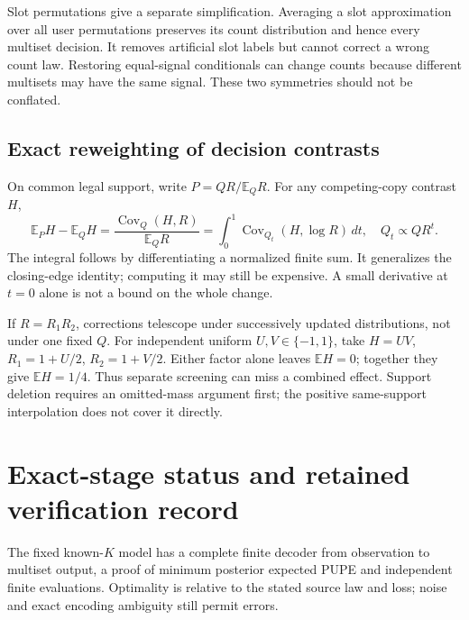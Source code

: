 \documentclass[10pt,a4paper]{article}
\newcommand{\E}{\mathbb E}
\begin{document}
Slot permutations give a separate simplification. Averaging a slot approximation over all user permutations
preserves its count distribution and hence every multiset decision. It removes artificial slot labels but
cannot correct a wrong count law. Restoring equal-signal conditionals can change counts because different
multisets may have the same signal. These two symmetries should not be conflated.

\subsection{Exact reweighting of decision contrasts}
On common legal support, write $P=QR/\E_QR$. For any competing-copy contrast $H$,
\begin{equation}
 \E_PH-\E_QH=\frac{\operatorname{Cov}_Q(H,R)}{\E_QR}
 =\int_0^1\operatorname{Cov}_{Q_t}(H,\log R)\,dt,
 \quad Q_t\propto Q R^t.
 \label{eq:combined-sensitivity}
\end{equation}
The integral follows by differentiating a normalized finite sum. It generalizes the closing-edge identity;
computing it may still be expensive. A small derivative at $t=0$ alone is not a bound on the whole change.

If $R=R_1R_2$, corrections telescope under successively updated distributions, not under one fixed $Q$.
For independent uniform $U,V\in\{-1,1\}$, take $H=UV$, $R_1=1+U/2$, $R_2=1+V/2$. Either factor alone leaves
$\E H=0$; together they give $\E H=1/4$. Thus separate screening can miss a combined effect. Support deletion
requires an omitted-mass argument first; the positive same-support interpolation does not cover it directly.

\clearpage
\section{Exact-stage status and retained verification record}
The fixed known-$K$ model has a complete finite decoder from observation to multiset output, a proof of
minimum posterior expected PUPE and independent finite evaluations. Optimality is relative to the stated
source law and loss; noise and exact encoding ambiguity still permit errors.
\end{document}
